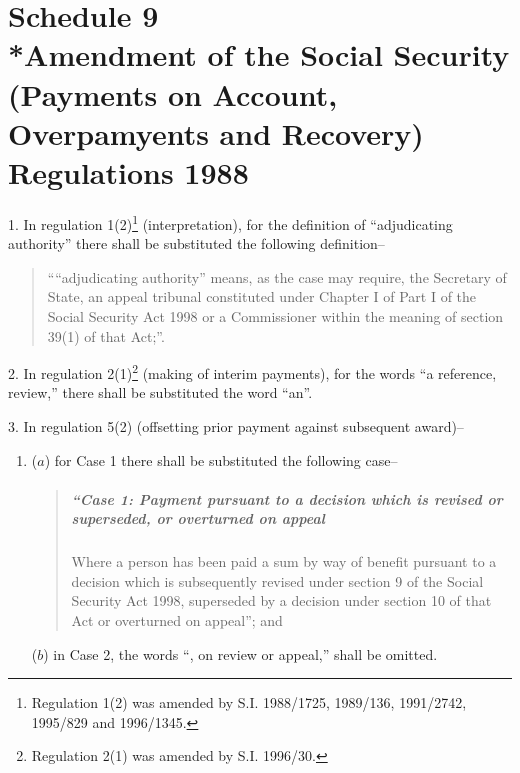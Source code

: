 \documentclass[12pt,a4paper]{article}
\begin{document}
\part[Schedule 9 --- Amendment of the Social Security (Payments on Account, Overpamyents and Recovery) Regulations 1988]{Schedule 9\\*Amendment of the Social Security (Payments on Account, Overpamyents and Recovery) Regulations 1988}

\renewcommand\parthead{--- Schedule 9}

1.  In regulation 1(2)\footnote{\frenchspacing Regulation 1(2) was amended by S.I. 1988/1725, 1989/136, 1991/2742, 1995/829 and 1996/1345.} (interpretation), for the definition of “adjudicating authority” there shall be substituted the following definition–
\begin{quotation}
    ““adjudicating authority” means, as the case may require, the Secretary of State, an appeal tribunal constituted under Chapter I of Part I of the Social Security Act 1998 or a Commissioner within the meaning of section 39(1) of that Act;”. 
\end{quotation}

\medskip

2.  In regulation 2(1)\footnote{\frenchspacing Regulation 2(1) was amended by S.I. 1996/30.} (making of interim payments), for the words “a reference, review,” there shall be substituted the word “an”.

\medskip

3.  In regulation 5(2) (offsetting prior payment against subsequent award)–
\begin{enumerate}\item[]
($a$) for Case 1 there shall be substituted the following case–
\begin{quotation}
\subsubsection*{“Case 1: Payment pursuant to a decision which is revised or superseded, or overturned on appeal}

Where a person has been paid a sum by way of benefit pursuant to a decision which is subsequently revised under section 9 of the Social Security Act 1998, superseded by a decision under section 10 of that Act or overturned on appeal”; and
\end{quotation}

($b$) in Case 2, the words “, on review or appeal,” shall be omitted.
\end{enumerate}
\end{document}
